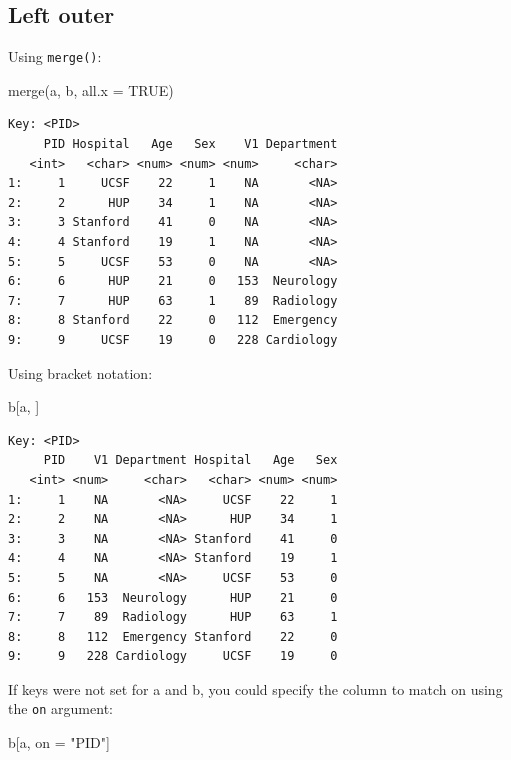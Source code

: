\documentclass[
]{book}
\newenvironment{Shaded}{\begin{snugshade}}{\end{snugshade}}
\newcommand{\AttributeTok}[1]{\textcolor[rgb]{0.77,0.63,0.00}{#1}}
\newcommand{\ConstantTok}[1]{\textcolor[rgb]{0.00,0.00,0.00}{#1}}
\newcommand{\FunctionTok}[1]{\textcolor[rgb]{0.00,0.00,0.00}{#1}}
\newcommand{\NormalTok}[1]{#1}
\newcommand{\OtherTok}[1]{\textcolor[rgb]{0.56,0.35,0.01}{#1}}
\newcommand{\StringTok}[1]{\textcolor[rgb]{0.31,0.60,0.02}{#1}}
\begin{document}
\hypertarget{left-outer}{%
\subsection{Left outer}\label{left-outer}}

Using \texttt{merge()}:

\begin{Shaded}
\begin{Highlighting}[]
\FunctionTok{merge}\NormalTok{(a, b, }\AttributeTok{all.x =} \ConstantTok{TRUE}\NormalTok{)}
\end{Highlighting}
\end{Shaded}

\begin{verbatim}
Key: <PID>
     PID Hospital   Age   Sex    V1 Department
   <int>   <char> <num> <num> <num>     <char>
1:     1     UCSF    22     1    NA       <NA>
2:     2      HUP    34     1    NA       <NA>
3:     3 Stanford    41     0    NA       <NA>
4:     4 Stanford    19     1    NA       <NA>
5:     5     UCSF    53     0    NA       <NA>
6:     6      HUP    21     0   153  Neurology
7:     7      HUP    63     1    89  Radiology
8:     8 Stanford    22     0   112  Emergency
9:     9     UCSF    19     0   228 Cardiology
\end{verbatim}

Using bracket notation:

\begin{Shaded}
\begin{Highlighting}[]
\NormalTok{b[a, ]}
\end{Highlighting}
\end{Shaded}

\begin{verbatim}
Key: <PID>
     PID    V1 Department Hospital   Age   Sex
   <int> <num>     <char>   <char> <num> <num>
1:     1    NA       <NA>     UCSF    22     1
2:     2    NA       <NA>      HUP    34     1
3:     3    NA       <NA> Stanford    41     0
4:     4    NA       <NA> Stanford    19     1
5:     5    NA       <NA>     UCSF    53     0
6:     6   153  Neurology      HUP    21     0
7:     7    89  Radiology      HUP    63     1
8:     8   112  Emergency Stanford    22     0
9:     9   228 Cardiology     UCSF    19     0
\end{verbatim}

If keys were not set for a and b, you could specify the column to match on using the \texttt{on} argument:

\begin{Shaded}
\begin{Highlighting}[]
\NormalTok{b[a, on }\OtherTok{=} \StringTok{"PID"}\NormalTok{]}
\end{Highlighting}
\end{Shaded}
\end{document}
